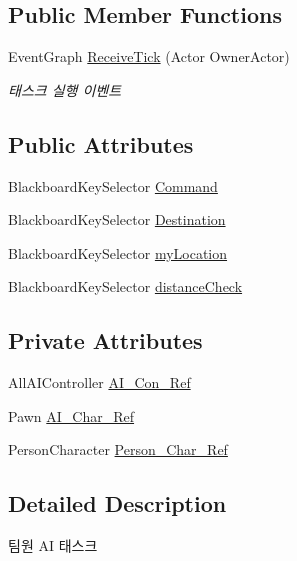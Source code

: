 \subsection*{Public Member Functions}
\begin{DoxyCompactItemize}
\item 
Event\+Graph \hyperlink{class_task___move_a9386876fe45eba6ac363a076b4aba91d}{Receive\+Tick} (Actor Owner\+Actor)
\begin{DoxyCompactList}\small\item\em 태스크 실행 이벤트 \end{DoxyCompactList}\end{DoxyCompactItemize}
\subsection*{Public Attributes}
\begin{DoxyCompactItemize}
\item 
Blackboard\+Key\+Selector \hyperlink{class_task___move_a07355e899645a177afabc2ad1d8da20f}{Command}
\item 
Blackboard\+Key\+Selector \hyperlink{class_task___move_aa7477f909bd65b5f050b065529afeada}{Destination}
\item 
Blackboard\+Key\+Selector \hyperlink{class_task___move_a406ee8c2665932b9b839ea0029dea7fb}{my\+Location}
\item 
Blackboard\+Key\+Selector \hyperlink{class_task___move_a564764b9700c2301ac543745c958f8b2}{distance\+Check}
\end{DoxyCompactItemize}
\subsection*{Private Attributes}
\begin{DoxyCompactItemize}
\item 
All\+A\+I\+Controller \hyperlink{class_task___move_aeeb637b648ae916d43d62859918c6780}{A\+I\+\_\+\+Con\+\_\+\+Ref}
\item 
Pawn \hyperlink{class_task___move_aeab62db691b93699ac595009005dfc51}{A\+I\+\_\+\+Char\+\_\+\+Ref}
\item 
Person\+Character \hyperlink{class_task___move_ad11b1b6b00d57886816c11c5e9a05274}{Person\+\_\+\+Char\+\_\+\+Ref}
\end{DoxyCompactItemize}


\subsection{Detailed Description}
팀원 AI 태스크 

